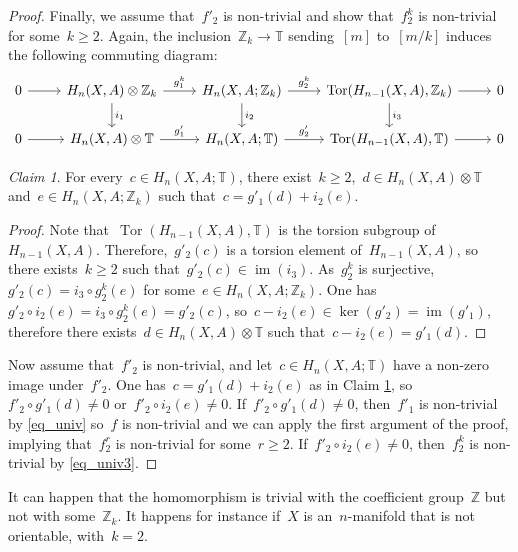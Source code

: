 \documentclass[english,11pt]{article}
\theoremstyle{plain}
\theoremstyle{remark}
\newtheorem{claim}{Claim}[section]
\theoremstyle{definition}
\newcommand{\R}{\mathbb{R}}
\newcommand{\Z}{\mathbb{Z}}
\newcommand{\RZ}{\mathbb{T}}%
\newcommand{\im}{\mathop{\mathrm{im}}}
\newcommand{\Tor}{\mathop{\mathrm{Tor}}}
\begin{document}
\begin{proof}
Finally, we assume that~$f'_2$ is non-trivial and show that~$f^k_2$ is non-trivial for some~$k\geq 2$. Again, the inclusion~$\Z_k\to\RZ$ sending~$[m]$ to~$[m/k]$ induces the following commuting diagram:
\begin{equation}\label{eq_univ2}
\begin{tikzcd}
0 \arrow{r} & H_n(X,A)\otimes \Z_k \arrow{r}{g^k_1} \arrow{d}{i_1} & H_n(X,A;\Z_k) \arrow{r}{g^k_2} \arrow{d}{i_2} & \Tor(H_{n-1}(X,A),\Z_k) \arrow[r] \arrow{d}{i_3} & 0\\
0 \arrow[r]  & H_n(X,A)\otimes \RZ \arrow{r}{g'_1}   & H_n(X,A;\RZ) \arrow{r}{g'_2}  & \Tor(H_{n-1}(X,A),\RZ)  \arrow[r] & 0
\end{tikzcd}
\end{equation}

\begin{claim}\label{claim_sum}
For every~$c\in H_n(X,A;\RZ)$, there exist~$k\geq 2$,~$d\in H_n(X,A)\otimes \RZ$ and~$e\in H_n(X,A;\Z_k)$ such that~$c=g'_1(d)+i_2(e)$.
\end{claim}
\begin{proof}
Note that~$\Tor(H_{n-1}(X,A),\RZ)$ is the torsion subgroup of~$H_{n-1}(X,A)$. Therefore,~$g'_2(c)$ is a torsion element of~$H_{n-1}(X,A)$, so there exists~$k\geq 2$ such that~$g'_2(c)\in \im(i_3)$. As~$g^k_2$ is surjective,~$g'_2(c)=i_3\circ g^k_2(e)$ for some~$e\in H_n(X,A;\Z_k)$. One has~$g'_2\circ i_2(e)=i_3\circ g^k_2(e)=g'_2(c)$, so~$c-i_2(e)\in\ker(g'_2)=\im(g'_1)$, therefore there exists~$d\in H_n(X,A)\otimes\RZ$ such that~$c-i_2(e)=g'_1(d)$.
\end{proof}

Now assume that~$f'_2$ is non-trivial, and let~$c\in H_n(X,A;\RZ)$ have a non-zero image under~$f'_2$. One has~$c=g'_1(d)+i_2(e)$ as in Claim \ref{claim_sum}, so~$f'_2\circ g'_1(d)\neq 0$ or~$f'_2\circ i_2(e)\neq 0$. If~$f'_2\circ g'_1(d)\neq 0$, then~$f'_1$ is non-trivial by \eqref{eq_univ} so~$f$ is non-trivial and we can apply the first argument of the proof, implying that~$f^{r}_2$ is non-trivial for some~$r\geq 2$. If~$f'_2\circ i_2(e)\neq 0$, then~$f^k_2$ is non-trivial by \eqref{eq_univ3}.
\end{proof}

It can happen that the homomorphism is trivial with the coefficient group~$\Z$ but not with some~$\Z_k$. It happens for instance if~$X$ is an~$n$-manifold that is not orientable, with~$k=2$.

%
%
%
%
\end{document}

